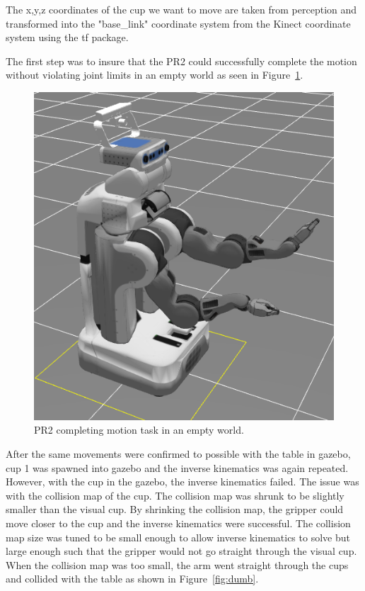 \documentclass[letterpaper, 10 pt, conference]{ieeeconf}  %
\begin{document}
The x,y,z coordinates of the cup we want to move are taken from perception and transformed into the "base\_link" coordinate system from the Kinect coordinate system using the tf package.

The first step was to insure that the PR2 could successfully complete the motion without violating joint limits in an empty world as seen in Figure~\ref{fig:empty}.

\begin{figure}[thpb]
      \centering
	  \includegraphics[scale =0.15]{pr2_empty_world}
      \caption{PR2 completing motion task in an empty world.}
      \label{fig:empty}
\end{figure}

After the same movements were confirmed to possible with the table in gazebo, cup 1 was spawned into gazebo and the inverse kinematics was again repeated. However, with the cup in the gazebo, the inverse kinematics failed. The issue was with the collision map of the cup. The collision map was shrunk to be slightly smaller than the visual cup. By shrinking the collision map, the gripper could move closer to the cup and the inverse kinematics were successful. The collision map size was tuned to be small enough to allow inverse kinematics to solve but large enough such that the gripper would not go straight through the visual cup. When the collision map was too small, the arm went straight through the cups and collided with the table as shown in Figure~\ref{fig:dumb}.
\end{document}
